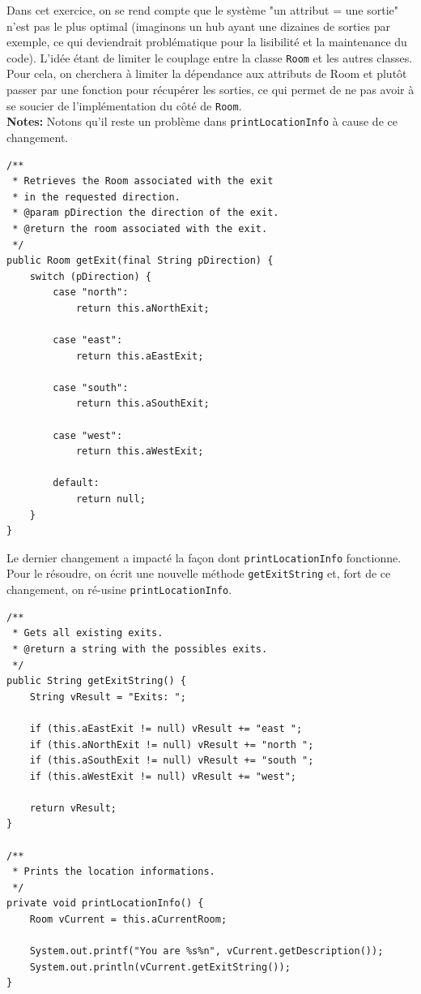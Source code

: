 \documentclass[a4paper,12pt]{report}
\begin{document}
\vfill

\begin{exercise}[subtitle=getExit]

Dans cet exercice, on se rend compte que le système "un attribut = une sortie" n'est pas le plus optimal (imaginons un hub ayant une dizaines de sorties par exemple, ce qui deviendrait problématique pour la lisibilité et la maintenance du code). L'idée étant de limiter le couplage entre la classe \verb|Room| et les autres classes. Pour cela, on cherchera à limiter la dépendance aux attributs de Room et plutôt passer par une fonction pour récupérer les sorties, ce qui permet de ne pas avoir à se soucier de l'implémentation du côté de \verb|Room|.\\ 

\textbf{Notes:} Notons qu'il reste un problème dans \verb|printLocationInfo| à cause de ce changement.

\vfill

\begin{verbatim}
/**
 * Retrieves the Room associated with the exit
 * in the requested direction.
 * @param pDirection the direction of the exit.
 * @return the room associated with the exit.
 */
public Room getExit(final String pDirection) {
    switch (pDirection) {
        case "north":
            return this.aNorthExit;

        case "east":
            return this.aEastExit;

        case "south":
            return this.aSouthExit;

        case "west":
            return this.aWestExit;

        default:
            return null;
    }
}
\end{verbatim}

\end{exercise}

\vfill

\begin{exercise}[subtitle=getExitString]
Le dernier changement a impacté la façon dont \verb|printLocationInfo| fonctionne. Pour le résoudre, on écrit une nouvelle méthode \verb|getExitString| et, fort de ce changement, on ré-usine \verb|printLocationInfo|.

\begin{verbatim}
/**
 * Gets all existing exits.
 * @return a string with the possibles exits.
 */
public String getExitString() {
    String vResult = "Exits: ";

    if (this.aEastExit != null) vResult += "east ";
    if (this.aNorthExit != null) vResult += "north ";
    if (this.aSouthExit != null) vResult += "south ";
    if (this.aWestExit != null) vResult += "west";

    return vResult;
}

/**
 * Prints the location informations.
 */
private void printLocationInfo() {
    Room vCurrent = this.aCurrentRoom;

    System.out.printf("You are %s%n", vCurrent.getDescription());
    System.out.println(vCurrent.getExitString());
}
\end{verbatim}
\end{exercise}
\end{document}
